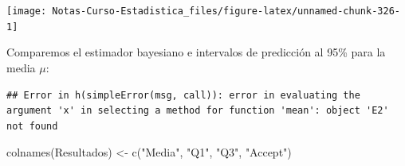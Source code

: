 \documentclass[
  12pt,
]{book}
\newenvironment{Shaded}{\begin{snugshade}}{\end{snugshade}}
\newcommand{\AttributeTok}[1]{\textcolor[rgb]{0.77,0.63,0.00}{#1}}
\newcommand{\ConstantTok}[1]{\textcolor[rgb]{0.00,0.00,0.00}{#1}}
\newcommand{\DecValTok}[1]{\textcolor[rgb]{0.00,0.00,0.81}{#1}}
\newcommand{\FloatTok}[1]{\textcolor[rgb]{0.00,0.00,0.81}{#1}}
\newcommand{\FunctionTok}[1]{\textcolor[rgb]{0.00,0.00,0.00}{#1}}
\newcommand{\NormalTok}[1]{#1}
\newcommand{\OtherTok}[1]{\textcolor[rgb]{0.56,0.35,0.01}{#1}}
\newcommand{\SpecialCharTok}[1]{\textcolor[rgb]{0.00,0.00,0.00}{#1}}
\newcommand{\StringTok}[1]{\textcolor[rgb]{0.31,0.60,0.02}{#1}}
\begin{document}
\begin{center}\texttt{[image: Notas-Curso-Estadistica\_files/figure-latex/unnamed-chunk-326-1]} \end{center}

Comparemos el estimador bayesiano e intervalos de predicción al 95\%
para la media \(\mu\):

\begin{Shaded}
\end{Shaded}

\begin{verbatim}
## Error in h(simpleError(msg, call)): error in evaluating the argument 'x' in selecting a method for function 'mean': object 'E2' not found
\end{verbatim}

\begin{Shaded}
\begin{Highlighting}[]
\FunctionTok{colnames}\NormalTok{(Resultados) }\OtherTok{\textless{}{-}} \FunctionTok{c}\NormalTok{(}\StringTok{"Media"}\NormalTok{, }\StringTok{"Q1"}\NormalTok{, }\StringTok{"Q3"}\NormalTok{, }\StringTok{"Accept"}\NormalTok{)}
\end{Highlighting}
\end{Shaded}
\end{document}
